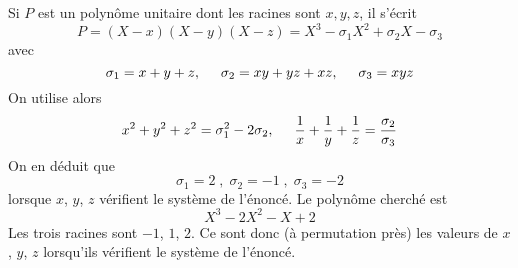 Si $P$ est un polynôme unitaire dont les racines sont $x,y,z$, il s'écrit
\[P=(X-x)(X-y)(X-z)=X^3-\sigma_1 X^2 + \sigma_2 X - \sigma_3\]
avec
\begin{displaymath}
\sigma_1 = x+y+z, \hspace{0.5cm}
\sigma_2 = xy+yz+xz, \hspace{0.5cm}
\sigma_3 = xyz 
\end{displaymath}
On utilise alors
\begin{displaymath}
x^2+y^2+z^2 = \sigma_1 ^2 -2\sigma_2 , \hspace{0.5cm}
\frac{1}{x}+\frac{1}{y}+\frac{1}{z} = \frac{\sigma_2}{\sigma_3}
\end{displaymath}
On en déduit que
\begin{displaymath}
 \sigma_1=2\;,\;\sigma_2=-1\;,\;\sigma_3=-2
\end{displaymath}
lorsque $x$, $y$, $z$ vérifient le système de l'énoncé. Le polynôme cherché est
\begin{displaymath}
X^3-2X^2-X+2 
\end{displaymath}
Les trois racines sont $-1$, $1$, $2$. Ce sont donc (à permutation près) les valeurs de $x$, $y$, $z$ lorsqu'ils vérifient le système de l'énoncé.